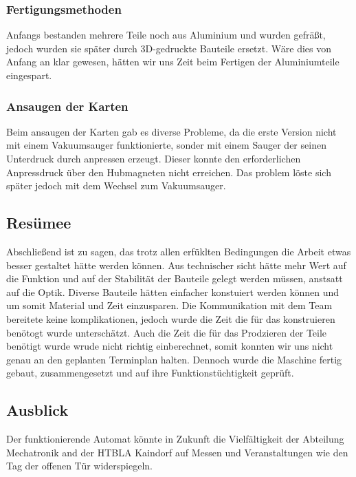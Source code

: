 \subsubsection{Fertigungsmethoden}
Anfangs bestanden mehrere Teile noch aus Aluminium und wurden gefräßt, jedoch wurden sie später durch 3D-gedruckte
Bauteile ersetzt. Wäre dies von Anfang an klar gewesen, hätten wir uns Zeit beim Fertigen der Aluminiumteile eingespart.
\subsubsection{Ansaugen der Karten}
Beim ansaugen der Karten gab es diverse Probleme, da die erste Version nicht mit einem Vakuumsauger funktionierte, sonder
mit einem Sauger der seinen Unterdruck durch anpressen erzeugt. Dieser konnte den erforderlichen Anpressdruck über
den Hubmagneten nicht erreichen. Das problem löste sich später jedoch mit dem Wechsel zum Vakuumsauger.

\subsection{Resümee}
Abschließend ist zu sagen, das trotz allen erfüklten Bedingungen die Arbeit etwas besser gestaltet hätte werden können.
Aus technischer sicht hätte mehr Wert auf die Funktion und auf der Stabilität der Bauteile gelegt werden müssen, anstsatt
auf die Optik. Diverse Bauteile hätten einfacher konstuiert werden können und um somit Material und Zeit einzusparen.
Die Kommunikation mit dem Team bereitete keine komplikationen, jedoch wurde die Zeit die für das konstruieren benötogt wurde
unterschätzt. Auch die Zeit die für das Prodzieren der Teile benötigt wurde wrude nicht richtig einberechnet, somit
konnten wir uns nicht genau an den geplanten Terminplan halten. Dennoch wurde die Maschine fertig gebaut, zusammengesetzt
und auf ihre Funktionstüchtigkeit geprüft.

\subsection{Ausblick}
Der funktionierende Automat könnte in Zukunft die Vielfältigkeit der Abteilung Mechatronik and der HTBLA Kaindorf auf
Messen und Veranstaltungen wie den Tag der offenen Tür widerspiegeln.
